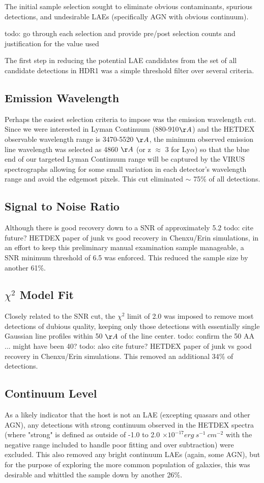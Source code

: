 \documentclass{aastex62}
\begin{document}
The initial sample selection sought to eliminate obvious contaminants, spurious detections, and undesirable LAEs (specifically AGN with obvious continuum).

todo: go through each selection and provide pre/post selection counts and justification for the value used

The first step in reducing the potential LAE candidates from the set of all candidate detections in HDR1 was a simple threshold filter over several criteria. 

\subsection{Emission Wavelength}
Perhaps the easiest selection criteria to impose was the emission wavelength cut. Since we were interested in Lyman Continuum (880-910$\AA$) and the HETDEX observable wavelength range is 3470-5520 $\AA$, the minimum observed emission line wavelength was selected as 4860 $\AA$ (or z $\approx$ 3 for Ly$\alpha$) so that the blue end of our targeted Lyman Continuum range will be captured by the VIRUS spectrographs allowing for some small variation in each detector's wavelength range and avoid the edgemost pixels. This cut eliminated $\sim$ 75\% of all detections.

\subsection{Signal to Noise Ratio}
Although there is good recovery down to a SNR of approximately 5.2  { \color{red} todo: cite future? HETDEX paper of junk vs good recovery in Chenxu/Erin simulations}, in an effort to keep this preliminary manual examination sample manageable, a SNR minimum threshold of 6.5 was enforced. This reduced the sample size by another 61\%.

\subsection{$\chi^{2}$ Model Fit}
Closely related to the SNR cut, the $\chi^{2}$ limit of 2.0 was imposed to remove most detections of dubious quality, keeping only those detections with essentially single Gaussian line profiles within 50 $\AA$ of the line center.  { \color{red} todo: confirm the 50 AA ... might have been 40?} { \color{red} todo: also cite future? HETDEX paper of junk vs good recovery in Chenxu/Erin simulations}. This removed an additional 34\% of detections.

\subsection{Continuum Level}
As a likely indicator that the host is not an LAE (excepting quasars and other AGN), any detections with strong continuum observed in the HETDEX spectra (where "strong" is defined as outside of -1.0 to 2.0 $\times 10^{-17} erg\ s^{-1}\ cm^{-2}$ with the negative range included to handle poor fitting and over subtraction) were excluded. This also removed any bright continuum LAEs (again, some AGN), but for the purpose of exploring the more common population of galaxies, this was desirable and whittled the sample down by another 26\%. 
\end{document}
